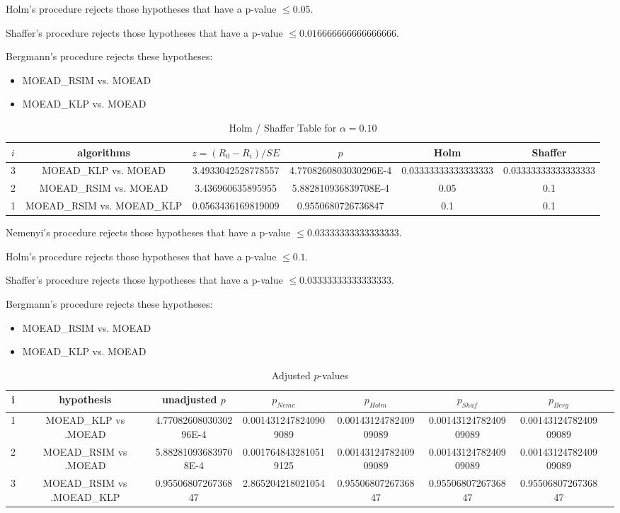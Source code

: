 \documentclass[a4paper,10pt]{article}
\begin{document}
\begin{landscape}
Holm's procedure rejects those hypotheses that have a p-value $\le0.05$.


Shaffer's procedure rejects those hypotheses that have a p-value $\le0.016666666666666666$.


Bergmann's procedure rejects these hypotheses:


\begin{itemize}


\item MOEAD_RSIM vs. MOEAD
\item MOEAD_KLP vs. MOEAD
\end{itemize}


\begin{table}[!htp]
\centering\tiny
\caption{Holm / Shaffer Table for $\alpha=0.10$}
\begin{tabular}{cccccc}
$i$&algorithms&$z=(R_0 - R_i)/SE$&$p$&Holm&Shaffer\\
\hline
3&MOEAD_KLP vs. MOEAD&3.4933042528778557&4.7708260803030296E-4&0.03333333333333333&0.03333333333333333\\
2&MOEAD_RSIM vs. MOEAD&3.436960635895955&5.882810936839708E-4&0.05&0.1\\
1&MOEAD_RSIM vs. MOEAD_KLP&0.0563436169819009&0.9550680726736847&0.1&0.1\\
\hline
\end{tabular}
\end{table}
Nemenyi's procedure rejects those hypotheses that have a p-value $\le0.03333333333333333$.


Holm's procedure rejects those hypotheses that have a p-value $\le0.1$.


Shaffer's procedure rejects those hypotheses that have a p-value $\le0.03333333333333333$.


Bergmann's procedure rejects these hypotheses:


\begin{itemize}


\item MOEAD_RSIM vs. MOEAD
\item MOEAD_KLP vs. MOEAD
\end{itemize}


\begin{table}[!htp]
\centering\tiny
\caption{Adjusted $p$-values}
\begin{tabular}{cccccccc}
i&hypothesis&unadjusted $p$&$p_{Neme}$&$p_{Holm}$&$p_{Shaf}$&$p_{Berg}$\\
\hline
1&MOEAD_KLP vs .MOEAD&4.7708260803030296E-4&0.0014312478240909089&0.0014312478240909089&0.0014312478240909089&0.0014312478240909089\\
2&MOEAD_RSIM vs .MOEAD&5.882810936839708E-4&0.0017648432810519125&0.0014312478240909089&0.0014312478240909089&0.0014312478240909089\\
3&MOEAD_RSIM vs .MOEAD_KLP&0.9550680726736847&2.865204218021054&0.9550680726736847&0.9550680726736847&0.9550680726736847\\
\hline
\end{tabular}
\end{table}

\end{landscape}
\end{document}
